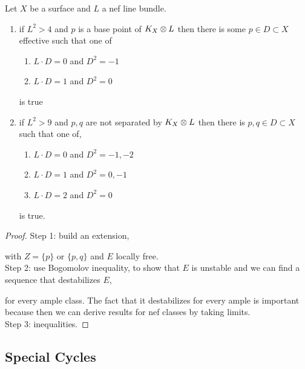 \documentclass[12pt]{article}
\begin{document}
\begin{theorem}
Let $X$ be a surface and $L$ a nef line bundle.
\begin{enumerate}
\item if $L^2 > 4$ and $p$ is a base point of $K_X \otimes L$ then there is some $p \in D \subset X$ effective such that one of
\begin{enumerate}
\item $L \cdot D = 0$ and $D^2 = -1$
\item $L \cdot D = 1$ and $D^2 = 0$
\end{enumerate}
is true

\item if $L^2 > 9$ and $p,q$ are not separated by $K_X \otimes L$ then there is $p,q \in D \subset X$ such that one of,
\begin{enumerate}
\item $L \cdot D = 0$ and $D^2 = -1,-2$
\item $L \cdot D = 1$ and $D^2 = 0,-1$
\item $L \cdot D = 2$ and $D^2 = 0$ 
\end{enumerate}
is true.
\end{enumerate}
\end{theorem}

\begin{proof}
Step 1: build an extension,
\begin{center}
\end{center}
with $Z = \{ p \}$ or $\{p, q \}$ and $E$ locally free.
\bigskip\\
Step 2: use Bogomolov inequality, to show that $E$ is unstable and we can find a sequence that destabilizes $E$,
\begin{center}
\end{center}
for every ample class. The fact that it destabilizes for every ample is important because then we can derive results for nef classes by taking limits.
\bigskip\\
Step 3: inequalities. 
\end{proof}


\subsection{Special Cycles}
\end{document}
